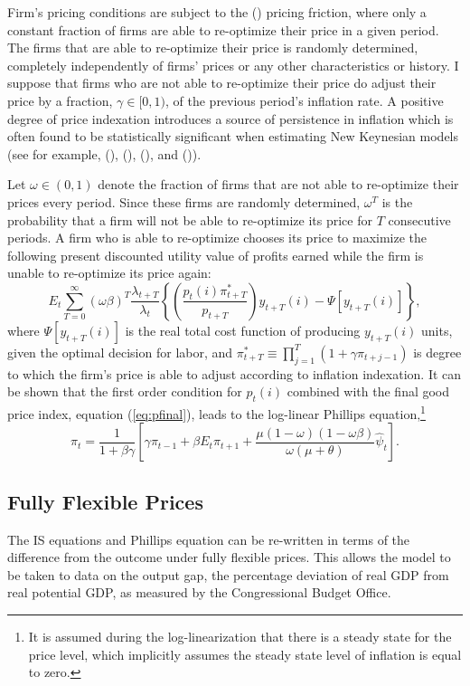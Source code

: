 \documentclass[12pt]{article}
\newcommand{\beq}{\begin{equation}}
\newcommand{\eeq}{\end{equation}}
\newcommand{\citee}[1]{\citename{#1} (\citeyear{#1})}
\newcommand{\h}[1]{\hat{#1}}
\begin{document}
Firm's pricing conditions are subject to the \citee{calvo1983} pricing friction, where only a constant fraction of firms are able to re-optimize their price in a given period.  The firms that are able to re-optimize their price is randomly determined, completely independently of firms' prices or any other characteristics or history.  I suppose that firms who are not able to re-optimize their price do adjust their price by a fraction, $\gamma \in [0,1)$, of the previous period's inflation rate.  A positive degree of price indexation introduces a source of persistence in inflation which is often found to be statistically significant when estimating New Keynesian models (see for example,  (\citeyear{smetswouters2003}), (\citeyear{smetswouters2005}), (\citeyear{smetswouters2007}), and \citee{milani2007}).

Let $\omega \in (0,1)$ denote the fraction of firms that are not able to re-optimize their prices every period.  Since these firms are randomly determined, $\omega^T$ is the probability that a firm will not be able to re-optimize its price for $T$ consecutive periods.  A firm who is able to re-optimize chooses its price to maximize the following present discounted utility value of profits earned while the firm is unable to re-optimize its price again: 
\beq \label{eq:intprofit}
E_t \sum_{T=0}^{\infty} \left(\omega \beta \right)^{T} \frac{\lambda_{t+T}}{\lambda_t}
\left\{ \left(\frac{p_{t}(i) \pi_{t+T}^{*}}{p_{t+T}}\right) y_{t+T}(i) - \Psi\left[y_{t+T}(i)\right] \right\},
\eeq
where $\Psi\left[y_{t+T}(i)\right]$ is the real total cost function of producing $y_{t+T}(i)$ units, given the optimal decision for labor, and $\pi_{t+T}^{*} \equiv \prod_{j=1}^{T} (1+\gamma \pi_{t+j-1})$ is degree to which the firm's price is able to adjust according to inflation indexation.  It can be shown that the first order condition for $p_{t}(i)$ combined with the final good price index, equation (\ref{eq:pfinal}), leads to the log-linear Phillips equation,\footnote{It is assumed during the log-linearization that there is a steady state for the price level, which implicitly assumes the steady state level of inflation is equal to zero.}
\beq \label{eq:phillips} \pi_t = \frac{1}{1+\beta \gamma} \left[ \gamma \pi_{t-1} + \beta E_t \pi_{t+1} + \frac{\mu (1-\omega)(1-\omega \beta)}{\omega (\mu + \theta)} \h{\psi}_t \right]. \eeq

\subsection{Fully Flexible Prices}
The IS equations and Phillips equation can be re-written in terms of the difference from the outcome under fully flexible prices.  This allows the model to be taken to data on the output gap, the percentage deviation of real GDP from real potential GDP, as measured by the Congressional Budget Office.  
\end{document}
